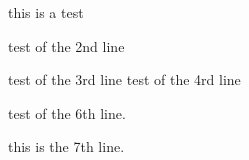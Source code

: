 this is a test

test of the 2nd line

test of the 3rd line
test of the 4rd line

test of the 6th line.

this is the 7th line.






